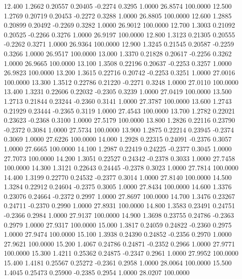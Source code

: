  12.400   1.2662   0.20557   0.20405  -0.2274   0.3295   1.0000  26.8574 100.0000
  12.500   1.2769   0.20719   0.20453  -0.2272   0.3288   1.0000  26.8805 100.0000
  12.600   1.2885   0.20899   0.20492  -0.2269   0.3282   1.0000  26.9012 100.0000
  12.700   1.3003   0.21092   0.20525  -0.2266   0.3276   1.0000  26.9197 100.0000
  12.800   1.3123   0.21305   0.20555  -0.2262   0.3271   1.0000  26.9364 100.0000
  12.900   1.3245   0.21545   0.20587  -0.2259   0.3266   1.0000  26.9517 100.0000
  13.000   1.3370   0.21828   0.20617  -0.2256   0.3262   1.0000  26.9665 100.0000
  13.100   1.3508   0.22196   0.20637  -0.2253   0.3257   1.0000  26.9823 100.0000
  13.200   1.3615   0.22716   0.20742  -0.2253   0.3251   1.0000  27.0016 100.0000
  13.300   1.3512   0.22786   0.21220  -0.2271   0.3248   1.0000  27.0110 100.0000
  13.400   1.3231   0.22606   0.22032  -0.2305   0.3239   1.0000  27.0419 100.0000
  13.500   1.2713   0.21844   0.23244  -0.2360   0.3141   1.0000  27.3787 100.0000
  13.600   1.2743   0.21929   0.23444  -0.2365   0.3119   1.0000  27.4543 100.0000
  13.700   1.2782   0.22021   0.23623  -0.2368   0.3100   1.0000  27.5179 100.0000
  13.800   1.2826   0.22116   0.23790  -0.2372   0.3084   1.0000  27.5734 100.0000
  13.900   1.2875   0.22214   0.23945  -0.2374   0.3069   1.0000  27.6226 100.0000
  14.000   1.2928   0.22315   0.24091  -0.2376   0.3057   1.0000  27.6665 100.0000
  14.100   1.2987   0.22419   0.24225  -0.2377   0.3045   1.0000  27.7073 100.0000
  14.200   1.3051   0.22527   0.24342  -0.2378   0.3033   1.0000  27.7458 100.0000
  14.300   1.3121   0.22643   0.24445  -0.2378   0.3023   1.0000  27.7814 100.0000
  14.400   1.3199   0.22770   0.24532  -0.2377   0.3014   1.0000  27.8140 100.0000
  14.500   1.3284   0.22912   0.24604  -0.2375   0.3005   1.0000  27.8434 100.0000
  14.600   1.3376   0.23076   0.24664  -0.2372   0.2997   1.0000  27.8697 100.0000
  14.700   1.3476   0.23267   0.24711  -0.2370   0.2990   1.0000  27.8931 100.0000
  14.800   1.3583   0.23491   0.24751  -0.2366   0.2984   1.0000  27.9137 100.0000
  14.900   1.3698   0.23755   0.24786  -0.2363   0.2979   1.0000  27.9317 100.0000
  15.000   1.3817   0.24059   0.24822  -0.2360   0.2975   1.0000  27.9474 100.0000
  15.100   1.3938   0.24390   0.24852  -0.2356   0.2970   1.0000  27.9621 100.0000
  15.200   1.4067   0.24786   0.24871  -0.2352   0.2966   1.0000  27.9771 100.0000
  15.300   1.4211   0.25362   0.24875  -0.2347   0.2961   1.0000  27.9952 100.0000
  15.400   1.4181   0.25567   0.25272  -0.2361   0.2958   1.0000  28.0064 100.0000
  15.500   1.4045   0.25473   0.25900  -0.2385   0.2954   1.0000  28.0207 100.0000
